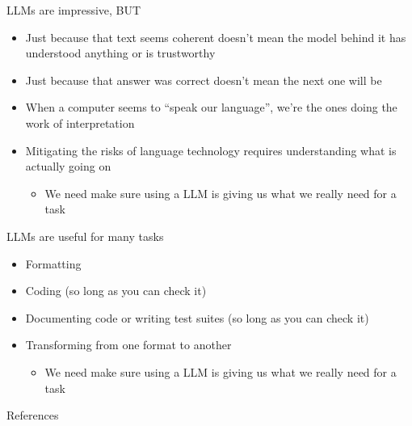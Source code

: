 \documentclass{beamer}
\begin{document}

\begin{frame}{LLMs are impressive, BUT}

\begin{itemize}
\item  Just because that text seems coherent doesn’t mean the model behind it has
understood anything or is trustworthy
\item  Just because that answer was correct doesn’t mean the next one will be
\item  When a computer seems to “speak our language”, we’re the ones
doing the work of interpretation
\item Mitigating the risks of language technology requires understanding what is actually going on
  \begin{itemize}
  \item We need make sure using a LLM is giving us what we really need for a task
  \end{itemize}
\end{itemize}
\end{frame}

\begin{frame}{LLMs are useful for many tasks}

\begin{itemize}
\item  Formatting
\item  Coding (so long as you can check it)
\item  Documenting code or writing test suites  (so long as you can check it)
  
\item Transforming from one format to another
  \begin{itemize}
  \item We need make sure using a LLM is giving us what we really need for a task
  \end{itemize}
\end{itemize}


\end{frame}





\begin{frame}[allowframebreaks]{References}




\end{frame}
\end{document}
